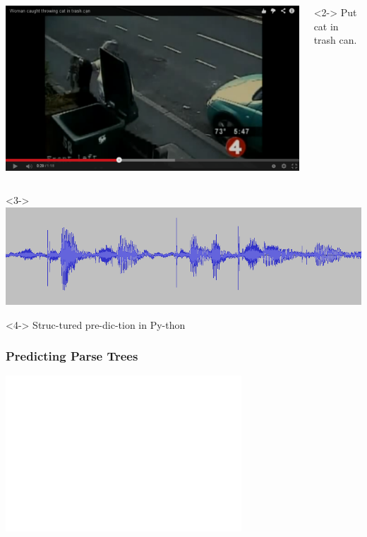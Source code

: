 \documentclass{beamer}
\begin{document}
\begin{frame}
\begin{columns}[t]
            \includegraphics[width=\linewidth]{images/cat_in_trashcan}\\
            \begin{visibleenv}<2->
                \tiny{Put cat in trash can.}
            \end{visibleenv}
        \end{columns}
    \vspace{5mm}
    \begin{center}
    \begin{visibleenv}<3->
            \includegraphics[width=.8\linewidth]{images/speech}\\
    \end{visibleenv}
    \begin{visibleenv}<4->
                Struc-tured pre-dic-tion in Py-thon
    \end{visibleenv}
    \end{center}
    \end{frame}

    \begin{frame}
        \frametitle{Predicting Parse Trees}
        \begin{center}
            \includegraphics[width=.8\linewidth]{images/parse_tree}
        \end{center}
    \end{frame}
\end{document}
